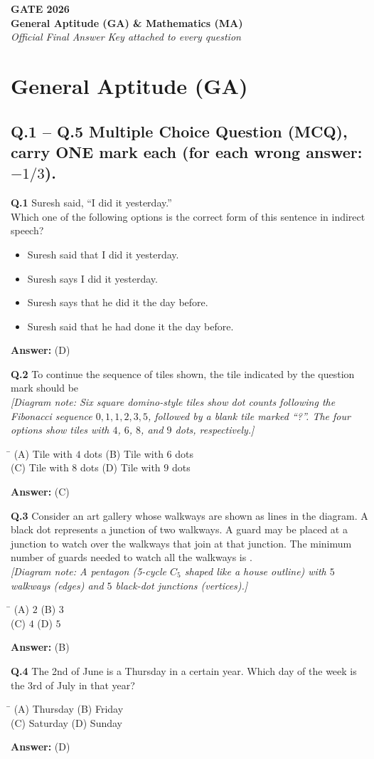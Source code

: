 \documentclass[11pt,a4paper]{article}
\newcommand{\optsfourA}[4]{%
  \begin{tabbing}
    \hspace{0.48\linewidth}\=\kill
    (A) #1 \> (B) #2 \\[2pt]
    (C) #3 \> (D) #4
  \end{tabbing}%
}
\newcommand{\optslistA}[4]{%
  \begin{itemize}
    \setlength{\itemsep}{2pt}\setlength{\parskip}{0pt}
    \item[(A)] #1
    \item[(B)] #2
    \item[(C)] #3
    \item[(D)] #4
  \end{itemize}%
}
\newcommand{\ans}[1]{\textbf{Answer:} #1\par\medskip}
\begin{document}
\newpage
\begin{center}
  {\LARGE\bfseries GATE 2026}\\[4pt]
  {\large\bfseries General Aptitude (GA) \& Mathematics (MA)}\\[2pt]
  {\small\itshape Official Final Answer Key attached to every question}
\end{center}
\medskip

\section*{General Aptitude (GA)}

\subsection*{Q.1 -- Q.5 Multiple Choice Question (MCQ), carry ONE mark each (for each wrong answer: $-1/3$).}

\textbf{Q.1} Suresh said, ``I did it yesterday.''\\
Which one of the following options is the correct form of this sentence in indirect speech?
\optslistA{Suresh said that I did it yesterday.}{Suresh says I did it yesterday.}{Suresh says that he did it the day before.}{Suresh said that he had done it the day before.}
\ans{(D)}

\textbf{Q.2} To continue the sequence of tiles shown, the tile indicated by the question mark should be\\[4pt]
\emph{[Diagram note: Six square domino-style tiles show dot counts following the Fibonacci sequence $0, 1, 1, 2, 3, 5$, followed by a blank tile marked ``?''. The four options show tiles with $4$, $6$, $8$, and $9$ dots, respectively.]}
\optsfourA{Tile with $4$ dots}{Tile with $6$ dots}{Tile with $8$ dots}{Tile with $9$ dots}
\ans{(C)}

\textbf{Q.3} Consider an art gallery whose walkways are shown as lines in the diagram. A black dot represents a junction of two walkways. A guard may be placed at a junction to watch over the walkways that join at that junction. The minimum number of guards needed to watch all the walkways is \underline{\hspace{2cm}}.\\
\emph{[Diagram note: A pentagon (5-cycle $C_5$ shaped like a house outline) with $5$ walkways (edges) and $5$ black-dot junctions (vertices).]}
\optsfourA{$2$}{$3$}{$4$}{$5$}
\ans{(B)}

\textbf{Q.4} The 2nd of June is a Thursday in a certain year. Which day of the week is the 3rd of July in that year?
\optsfourA{Thursday}{Friday}{Saturday}{Sunday}
\ans{(D)}
\end{document}
